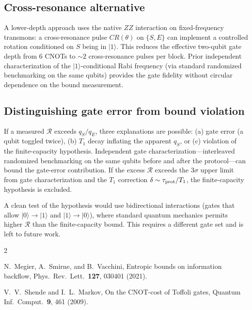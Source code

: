 \documentclass[aps,pra,onecolumn]{revtex4-2}
\begin{document}
\subsection{Cross-resonance alternative}

A lower-depth approach uses the native $ZZ$ interaction on fixed-frequency transmons: a cross-resonance pulse $CR(\theta)$ on $\{S, E\}$ can implement a controlled rotation conditioned on $S$ being in $|1\rangle$. This reduces the effective two-qubit gate depth from 6 CNOTs to $\sim 2$ cross-resonance pulses per block. Prior independent characterization of the $|1\rangle$-conditional Rabi frequency (via standard randomized benchmarking on the same qubits) provides the gate fidelity without circular dependence on the bound measurement.

\subsection{Distinguishing gate error from bound violation}

If a measured $\mathcal{R}$ exceeds $q_S/q_E$, three explanations are possible: (a) gate error (a qubit toggled twice), (b) $T_1$ decay inflating the apparent $q_S$, or (c) violation of the finite-capacity hypothesis. Independent gate characterization---interleaved randomized benchmarking on the same qubits before and after the protocol---can bound the gate-error contribution. If the excess $\mathcal{R}$ exceeds the $3\sigma$ upper limit from gate characterization and the $T_1$ correction $\delta \sim \tau_{\rm prot}/T_1$, the finite-capacity hypothesis is excluded.

A clean test of the hypothesis would use bidirectional interactions (gates that allow $|0\rangle \to |1\rangle$ and $|1\rangle \to |0\rangle$), where standard quantum mechanics permits higher $\mathcal{R}$ than the finite-capacity bound. This requires a different gate set and is left to future work.

\begin{thebibliography}{2}

N.~Megier, A.~Smirne, and B.~Vacchini,
Entropic bounds on information backflow,
Phys.\ Rev.\ Lett.\ \textbf{127}, 030401 (2021).

V.~V.~Shende and I.~L.~Markov,
On the CNOT-cost of Toffoli gates,
Quantum Inf.\ Comput.\ \textbf{9}, 461 (2009).

\end{thebibliography}
\end{document}
